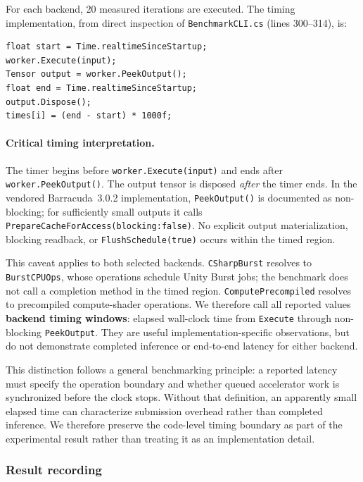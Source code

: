 \documentclass[10pt,twocolumn]{article}
\begin{document}
For each backend, 20 measured iterations are executed. The timing implementation, from direct inspection of \texttt{BenchmarkCLI.cs} (lines 300--314), is:

\begin{lstlisting}[basicstyle=\scriptsize\ttfamily,frame=single,language={[Sharp]C}]
float start = Time.realtimeSinceStartup;
worker.Execute(input);
Tensor output = worker.PeekOutput();
float end = Time.realtimeSinceStartup;
output.Dispose();
times[i] = (end - start) * 1000f;
\end{lstlisting}

\paragraph{Critical timing interpretation.}
The timer begins before \texttt{worker.Execute(input)} and ends after \texttt{worker.PeekOutput()}. The output tensor is disposed \emph{after} the timer ends. In the vendored Barracuda~3.0.2 implementation, \texttt{PeekOutput()} is documented as non-blocking; for sufficiently small outputs it calls \texttt{PrepareCacheForAccess(blocking:false)}. No explicit output materialization, blocking readback, or \texttt{FlushSchedule(true)} occurs within the timed region.

This caveat applies to both selected backends. \texttt{CSharpBurst} resolves to \texttt{BurstCPUOps}, whose operations schedule Unity Burst jobs; the benchmark does not call a completion method in the timed region. \texttt{ComputePrecompiled} resolves to precompiled compute-shader operations. We therefore call all reported values \textbf{backend timing windows}: elapsed wall-clock time from \texttt{Execute} through non-blocking \texttt{PeekOutput}. They are useful implementation-specific observations, but do not demonstrate completed inference or end-to-end latency for either backend.

This distinction follows a general benchmarking principle: a reported latency must specify the operation boundary and whether queued accelerator work is synchronized before the clock stops. Without that definition, an apparently small elapsed time can characterize submission overhead rather than completed inference. We therefore preserve the code-level timing boundary as part of the experimental result rather than treating it as an implementation detail.

\subsubsection{Result recording}
\end{document}
